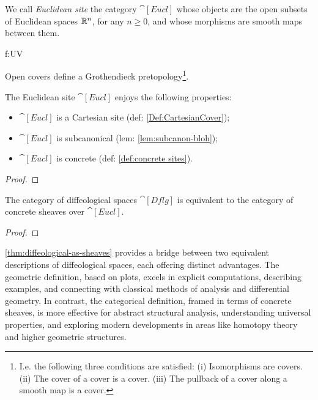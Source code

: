 \documentclass[a4paper,11pt]{article}  %
\newcommand{\Eucl}{\cat[Eucl]}
\newcommand{\Dflg}{\cat[Dflg]}
\begin{document}
\begin{definition}
	We call \emph{Euclidean site} the category $\Eucl$ whose objects are the open subsets of Euclidean spaces $\mathbb{R}^n$, for any $n \geq 0$,  and whose morphisms are smooth maps between them.
	
	\catdef{\Eucl}{U\subset\Real^n \text{\quad Open,}\forall n\geq 0 }
	{f:U\to V }

	Open covers define a Grothendieck pretopology\footnote{I.e. the following three conditions are satisfied: (i)
Isomorphisms are covers. (ii) The cover of a cover is a cover. (iii) The pullback of
a cover along a smooth map is a cover.}.

\end{definition}

\begin{proposition}
	The Euclidean site $\Eucl$ enjoys the following properties:
	\begin{itemize}
		\item $\Eucl$ is a Cartesian site (def: \cref{Def:CartesianCover});
		\item $\Eucl$ is subcanonical (lem: \cref{lem:subcanon-bloh});
		\item $\Eucl$ is concrete (def: \cref{def:concrete sites}).
	\end{itemize}
\end{proposition}
\begin{proof}
	\vspace{5em}
\end{proof}


\begin{theorem}\label{thm:diffeological-as-sheaves}
	The category of diffeological spaces $\Dflg$ is equivalent to the category of concrete sheaves over $\Eucl$.
\end{theorem}
\begin{proof}
	\vspace{5em}
\end{proof}

\cref{thm:diffeological-as-sheaves} provides a bridge between two equivalent descriptions of diffeological spaces, each offering distinct advantages. 
The geometric definition, based on plots, excels in explicit computations, describing examples, and connecting with classical methods of analysis and differential geometry. 
In contrast, the categorical definition, framed in terms of concrete sheaves, is more effective for abstract structural analysis, understanding universal properties, and exploring modern developments in areas like homotopy theory and higher geometric structures.
\end{document}
